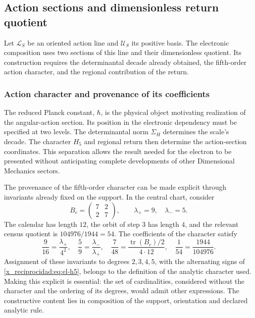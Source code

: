 \subsection{Action sections and dimensionless return quotient}

Let \(\mathcal L_S\) be an oriented action line and \(\mathcal U_S\)
its positive basis. The electronic composition uses two sections of
this line and their dimensionless quotient. Its construction requires
the determinantal decade already obtained, the fifth-order action character,
and the regional contribution of the return.

\subsubsection{Action character and provenance of its coefficients}
\label{x_reciprocidad:sec:revision-planck}

The reduced Planck constant, \(\hbar\), is the physical object motivating realization of the angular-action section. Its position in the electronic dependency must be specified at two levels. The determinantal norm \(\Sigma_H\) determines the scale's decade. The character \(H_5\) and regional return then determine the action-section coordinates. This separation allows the result needed for the electron to be presented without anticipating complete developments of other Dimensional Mechanics sectors.

The provenance of the fifth-order character can be made explicit through invariants already fixed on the support. In the central chart, consider
\[
 B_c=\begin{pmatrix}7&2\\2&7\end{pmatrix},
 \qquad \lambda_+=9,\quad\lambda_-=5.
\]
The calendar has length \(12\), the orbit of step \(3\) has length \(4\), and the relevant census quotient is \(104976/1944=54\). The coefficients of the character satisfy
\begin{equation}
 \frac9{16}=\frac{\lambda_+}{4^2},\quad
 \frac59=\frac{\lambda_-}{\lambda_+},\quad
 \frac7{48}=\frac{\operatorname{tr}(B_c)/2}{4\cdot12},\quad
 \frac1{54}=\frac{1944}{104976}.
 \label{x_reciprocidad:eq:revision-h5-coeficientes}
\end{equation}
Assignment of these invariants to degrees \(2,3,4,5\), with the alternating signs of \eqref{x_reciprocidad:eq:el-h5}, belongs to the definition of the analytic character used. Making this explicit is essential: the set of cardinalities, considered without the character and the ordering of its degrees, would admit other expressions. The constructive content lies in composition of the support, orientation and declared analytic rule.

